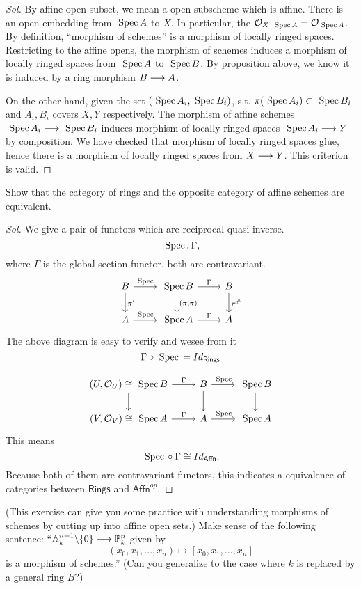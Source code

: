 \documentclass[11pt]{book} %
\begin{document}
\begin{proof}[Sol]
By affine open subset, we mean a open subscheme which is affine. There is an open embedding from $\text{ Spec\,} A$ to $X$. In particular, the ${\cal O}_X|_{\text{ Spec\,} A}={\cal O}_{\text{ Spec\,} A}$. By definition,  ``morphism of schemes'' is a morphism of locally ringed spaces. Restricting to the affine opens, the morphism of schemes induces a morphism of locally ringed spaces from $\text{ Spec\,} A$ to $\text{ Spec\,} B$. By proposition above, we know it is induced by a ring morphism $B\longrightarrow A$.


On the other hand, given the set $(\text{ Spec\,} A_i,\text{ Spec\,} B_i)$, s.t. $\pi(\text{ Spec\,} A_i)\subset\text{ Spec\,} B_i$ and $A_i, B_i$ covers $X, Y$ respectively. 
The morphism of affine schemes $\text{ Spec\,} A_i\longrightarrow \text{ Spec\,} B_i$ induces morphism of locally ringed spaces $\text{ Spec\,} A_i\longrightarrow Y$ by composition. 
We have checked that morphism of locally ringed spaces glue, hence there is a morphism of locally ringed spaces from $X\longrightarrow Y$. This criterion is valid.
\end{proof}
\begin{exr}
Show that the category of rings and the opposite category of affine schemes are equivalent.
\end{exr}
\begin{proof}[Sol]
We give a pair of functors which are reciprocal quasi-inverse.
$$
\text{ Spec\,} ,\Gamma,
$$
where $\Gamma$ is the global section functor, both are contravariant.
$$
\begin{tikzcd}
B \arrow[r, "\spec"] \arrow[d, "\pi'"] & \spec B \arrow[r, "\Gamma"] \arrow[d, "{(\pi,\tilde{\pi})}"] & B \arrow[d, "\pi^\#"] \\
A \arrow[r, "\spec"] & \spec A \arrow[r, "\Gamma"] & A
\end{tikzcd}
$$
The above diagram is easy to verify and wesee from it
$$
\Gamma\circ \text{ Spec\,} =Id_{\mathsf{Rings}}
$$

$$
\begin{tikzcd}
(U,\calo_U)\cong \spec B \arrow[r, "\Gamma"] \arrow[d] & B \arrow[r, "\spec "] \arrow[d] & \spec B \arrow[d] \\
(V,\calo_V)\cong\spec A \arrow[r, "\Gamma"] & A \arrow[r, "\spec"] & \spec A
\end{tikzcd}
$$
This means
$$
\text{ Spec\,}\circ \Gamma\cong Id_{\mathsf{Affn}}.
$$
Because both of them are contravariant functors, this indicates a equivalence of categories between $\mathsf{Rings}$ and $\mathsf{Affn}^{op}$.

\end{proof}
\begin{exr}
(This exercise can give you some practice with understanding morphisms of schemes by cutting up into affine open sets.) Make sense of the following sentence: ``$ \mathbb A^{n+1}_k\backslash \{0\}\longrightarrow \mathbb P^n_k$ given by 
$$
(x_0,x_1,...,x_n)\mapsto[x_0,x_1,...,x_n]
$$
is a morphism of schemes.''
(Can you generalize to the case where $k$ is replaced by a general ring $B$?)
\end{exr}
\end{document}
